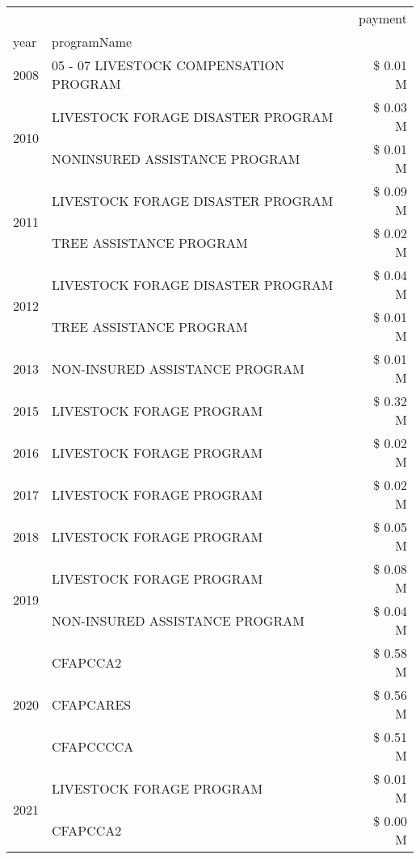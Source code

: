 \begin{tabular}{llr}
\toprule
 &  & payment \\
year & programName &  \\
\midrule
2008 & 05 - 07 LIVESTOCK COMPENSATION PROGRAM & \$ 0.01 M \\
\cline{1-3}
\multirow[t]{2}{*}{2010} & LIVESTOCK FORAGE DISASTER  PROGRAM & \$ 0.03 M \\
 & NONINSURED ASSISTANCE PROGRAM & \$ 0.01 M \\
\cline{1-3}
\multirow[t]{2}{*}{2011} & LIVESTOCK FORAGE DISASTER PROGRAM & \$ 0.09 M \\
 & TREE ASSISTANCE PROGRAM & \$ 0.02 M \\
\cline{1-3}
\multirow[t]{2}{*}{2012} & LIVESTOCK FORAGE DISASTER PROGRAM & \$ 0.04 M \\
 & TREE ASSISTANCE PROGRAM & \$ 0.01 M \\
\cline{1-3}
2013 & NON-INSURED ASSISTANCE PROGRAM & \$ 0.01 M \\
\cline{1-3}
2015 & LIVESTOCK FORAGE PROGRAM & \$ 0.32 M \\
\cline{1-3}
2016 & LIVESTOCK FORAGE PROGRAM                      & \$ 0.02 M \\
\cline{1-3}
2017 & LIVESTOCK FORAGE PROGRAM & \$ 0.02 M \\
\cline{1-3}
2018 & LIVESTOCK FORAGE PROGRAM & \$ 0.05 M \\
\cline{1-3}
\multirow[t]{2}{*}{2019} & LIVESTOCK FORAGE PROGRAM & \$ 0.08 M \\
 & NON-INSURED ASSISTANCE PROGRAM & \$ 0.04 M \\
\cline{1-3}
\multirow[t]{3}{*}{2020} & CFAPCCA2 & \$ 0.58 M \\
 & CFAPCARES & \$ 0.56 M \\
 & CFAPCCCCA & \$ 0.51 M \\
\cline{1-3}
\multirow[t]{2}{*}{2021} & LIVESTOCK FORAGE PROGRAM & \$ 0.01 M \\
 & CFAPCCA2 & \$ 0.00 M \\
\cline{1-3}
\bottomrule
\end{tabular}
